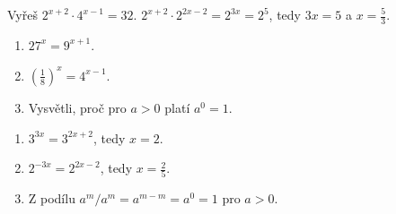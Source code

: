 \documentclass[11pt,a4paper]{article}
\begin{document}
\begin{zadaniReseniBox}[title={Rozšíření 1}]
Vyřeš $2^{x+2}\cdot4^{x-1}=32$.
\tcblower
$2^{x+2}\cdot2^{2x-2}=2^{3x}=2^5$, tedy $3x=5$ a $x=\frac53$.
\end{zadaniReseniBox}
\begin{zadaniReseniBox}[title={Domácí úkol}]
\begin{enumerate}[label=\alph*)]
\item $27^x=9^{x+1}$.
\item $\left(\frac18\right)^{x}=4^{x-1}$.
\item Vysvětli, proč pro $a>0$ platí $a^0=1$.
\end{enumerate}
\tcblower
\begin{enumerate}[label=\alph*)]
\item $3^{3x}=3^{2x+2}$, tedy $x=2$.
\item $2^{-3x}=2^{2x-2}$, tedy $x=\frac25$.
\item Z podílu $a^m/a^m=a^{m-m}=a^0=1$ pro $a>0$.
\end{enumerate}
\end{zadaniReseniBox}
\end{document}
